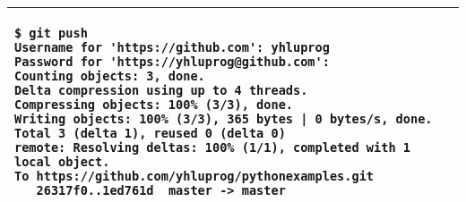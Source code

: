 \vspace{0.2in}
\noindent
\begin{tabular}{|p{5in}|}\hline
\begin{verbatim}
$ git push
Username for 'https://github.com': yhluprog
Password for 'https://yhluprog@github.com': 
Counting objects: 3, done.
Delta compression using up to 4 threads.
Compressing objects: 100% (3/3), done.
Writing objects: 100% (3/3), 365 bytes | 0 bytes/s, done.
Total 3 (delta 1), reused 0 (delta 0)
remote: Resolving deltas: 100% (1/1), completed with 1 local object.
To https://github.com/yhluprog/pythonexamples.git
   26317f0..1ed761d  master -> master
\end{verbatim}
\\ \hline
\end{tabular}
\vspace{0.2in}

\begin{figure}[h] \centering
{\texttt{[image: \\thischapterpath/figures/github10.png]}}
\caption{The added file {\tt hello.py} is listed in {\tt github}.}
\label{fig:github10}
\end{figure}

A directory can be created using the {\tt mkdir} command in
Linux. Adding a file in a directory automatically to the repository
adds the directory.

To remove a file, use the {\tt git rm} command, followed by {\tt git commit}.
If {\tt git push} is used, the file is also removed from {\tt github}.

\vspace{0.2in}
\noindent
\begin{tabular}{|p{5in}|}\hline
\begin{verbatim}
$ git rm hello.py
rm 'hello.py'
$ git commit -m "remove the file" hello.py
[master 3357bae] remove the file
 1 file changed, 7 deletions(-)
 delete mode 100755 hello.py
$ git push
Username for 'https://github.com': yhluprog
Password for 'https://yhluprog@github.com': 
Counting objects: 2, done.
Delta compression using up to 4 threads.
Compressing objects: 100% (2/2), done.
Writing objects: 100% (2/2), 221 bytes | 0 bytes/s, done.
Total 2 (delta 1), reused 0 (delta 0)
remote: Resolving deltas: 100% (1/1), completed with 1 local object.
To https://github.com/yhluprog/pythonexamples.git
   1ed761d..3357bae  master -> master
\end{verbatim}
\\ \hline
\end{tabular}
\vspace{0.2in}

